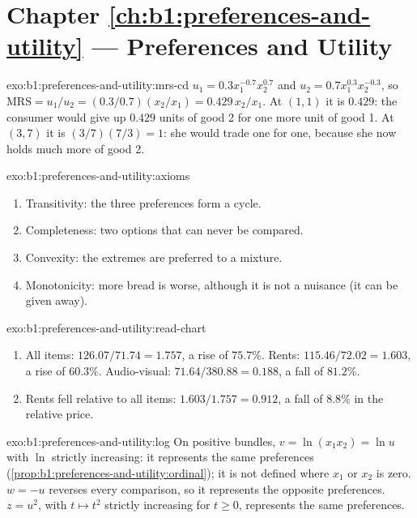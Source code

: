 \section*{Chapter \ref{ch:b1:preferences-and-utility} --- Preferences and Utility}

\begin{solution}{exo:b1:preferences-and-utility:mrs-cd}
$u_1 = 0.3x_1^{-0.7}x_2^{0.7}$ and $u_2 = 0.7x_1^{0.3}x_2^{-0.3}$, so
$\mathrm{MRS} = u_1/u_2 = (0.3/0.7)(x_2/x_1) = 0.429\,x_2/x_1$. At $(1, 1)$
it is $0.429$: the consumer would give up $0.429$ units of good 2 for one
more unit of good 1. At $(3, 7)$ it is $(3/7)(7/3) = 1$: she would trade
one for one, because she now holds much more of good 2.
\end{solution}

\begin{solution}{exo:b1:preferences-and-utility:axioms}
\begin{enumerate}
  \item Transitivity: the three preferences form a cycle.
  \item Completeness: two options that can never be compared.
  \item Convexity: the extremes are preferred to a mixture.
  \item Monotonicity: more bread is worse, although it is not a nuisance (it can be given away).
\end{enumerate}
\end{solution}

\begin{solution}{exo:b1:preferences-and-utility:read-chart}
\begin{enumerate}
  \item All items: $126.07/71.74 = 1.757$, a rise of $75.7\%$. Rents:
    $115.46/72.02 = 1.603$, a rise of $60.3\%$. Audio-visual:
    $71.64/380.88 = 0.188$, a fall of $81.2\%$.
  \item Rents fell relative to all items: $1.603/1.757 = 0.912$, a fall of
    $8.8\%$ in the relative price.
\end{enumerate}
\end{solution}

\begin{solution}{exo:b1:preferences-and-utility:log}
On positive bundles, $v = \ln(x_1x_2) = \ln u$ with $\ln$ strictly increasing:
it represents the same preferences
(\cref{prop:b1:preferences-and-utility:ordinal}); it is not defined where
$x_1$ or $x_2$ is zero. $w = -u$ reverses every comparison, so it represents
the opposite preferences. $z = u^2$, with $t \mapsto t^2$ strictly increasing
for $t \ge 0$, represents the same preferences.
\end{solution}

